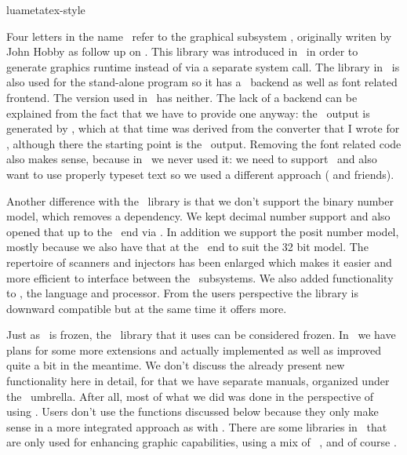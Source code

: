 
\environment luametatex-style

\startdocument[title=Metapost]

\startsubject[title=Contents]
    \setups[sectioncontents]
\stopsubject

\startsection[title={Introduction}]

Four letters in the name \LUAMETATEX\ refer to the graphical subsystem \METAPOST,
originally writen by John Hobby as follow up on \METAFONT. This library was
introduced in \LUATEX\ in order to generate graphics runtime instead of via a
separate system call. The library in \LUATEX\ is also used for the stand-alone
program so it has a \POSTSCRIPT\ backend as well as font related frontend. The
version used in \LUAMETATEX\ has neither. The lack of a backend can be explained
from the fact that we have to provide one anyway: the \PDF\ output is generated
by \LUA, which at that time was derived from the converter that I wrote for
\PDFTEX, although there the starting point is the \POSTSCRIPT\ output. Removing
the font related code also makes sense, because in \MKIV\ we never used it: we
need to support \OPENTYPE\ and also want to use properly typeset text so we used
a different approach ( and friends).

Another difference with the \LUATEX\ library is that we don't support the binary
number model, which removes a dependency. We kept decimal number support and also
opened that up to the \TEX\ end via \LUA. In addition we support the posit number
model, mostly because we also have that at the \TEX\ end to suit the 32 bit
model. The repertoire of scanners and injectors has been enlarged which makes it
easier and more efficient to interface between the \LUAMETATEX\ subsystems. We
also added functionality to \METAPOST, the language and processor. From the users
perspective the library is downward compatible but at the same time it offers
more.

Just as \LUATEX\ is frozen, the \METAPOST\ library that it uses can be considered
frozen. In \LUAMETATEX\ we have plans for some more extensions and actually
implemented as well as improved quite a bit in the meantime. We don't discuss the
already present new functionality here in detail, for that we have separate
manuals, organized under the \LUAMETAFUN\ umbrella. After all, most of what we
did was done in the perspective of using \CONTEXT. Users don't use the functions
discussed below because they only make sense in a more integrated approach as
with \LUAMETAFUN. There are some libraries in \LUAMETATEX\ that are only used for
enhancing graphic capabilities, using a mix of \LUA\, \CCODE, and of course
\METAPOST.

